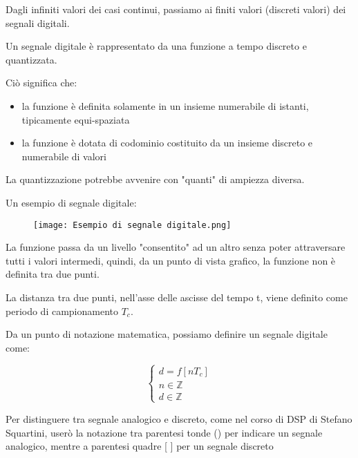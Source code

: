Dagli infiniti valori dei casi continui, passiamo ai finiti valori 
(discreti valori) dei segnali digitali. \newline 

Un segnale digitale è rappresentato da una funzione a tempo discreto e quantizzata. \newline 

Ciò significa che: 

\begin{itemize}
    \item la funzione è definita solamente in un insieme numerabile di istanti, tipicamente equi-spaziata 
    \item la funzione è dotata di codominio costituito da un insieme discreto e numerabile di valori
\end{itemize}

La quantizzazione potrebbe avvenire con "quanti" di ampiezza diversa. \newline 

Un esempio di segnale digitale: 

\begin{figure}[h]
    \centering
    \texttt{[image: Esempio di segnale digitale.png]}
\end{figure}

La funzione passa da un livello "consentito" ad un altro senza poter attraversare tutti i valori intermedi, 
quindi, da un punto di vista grafico, la funzione non è definita tra due punti. \newline 

La distanza tra due punti, nell'asse delle ascisse del tempo t, viene definito come periodo di campionamento $T_c$. \newline 

Da un punto di notazione matematica, possiamo definire un segnale digitale come: 

{
    \Large 
    \begin{equation}
        \begin{cases}
        d = f[n T_c]
        \\
        n \in \mathbb{Z}  
        \\ 
        d \in \mathbb{Z}
        \end{cases}
    \end{equation}
}

\begin{tcolorbox}
    Per distinguere tra segnale analogico e discreto, 
    come nel corso di DSP di Stefano Squartini, userò la notazione tra parentesi tonde () per indicare un segnale analogico, 
    mentre a parentesi quadre [ ] per un segnale discreto 
\end{tcolorbox}


